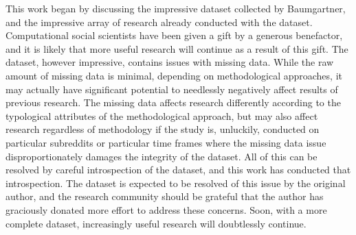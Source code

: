 \documentclass[letterpaper,12pt]{article}
\begin{document}
This work began by discussing the impressive dataset collected by Baumgartner, and the impressive array of research already conducted with the dataset. Computational social scientists have been given a gift by a generous benefactor, and it is likely that more useful research will continue as a result of this gift. The dataset, however impressive, contains issues with missing data. While the raw amount of missing data is minimal, depending on methodological approaches, it may actually have significant potential to needlessly negatively affect results of previous research. The missing data affects research differently according to the typological attributes of the methodological approach, but may also affect research regardless of methodology if the study is, unluckily, conducted on particular subreddits or particular time frames where the missing data issue disproportionately damages the integrity of the dataset. All of this can be resolved by careful introspection of the dataset, and this work has conducted that introspection. The dataset is expected to be resolved of this issue by the original author, and the research community should be grateful that the author has graciously donated more effort to address these concerns. Soon, with a more complete dataset, increasingly useful research will doubtlessly continue.



\clearpage
\end{document}
